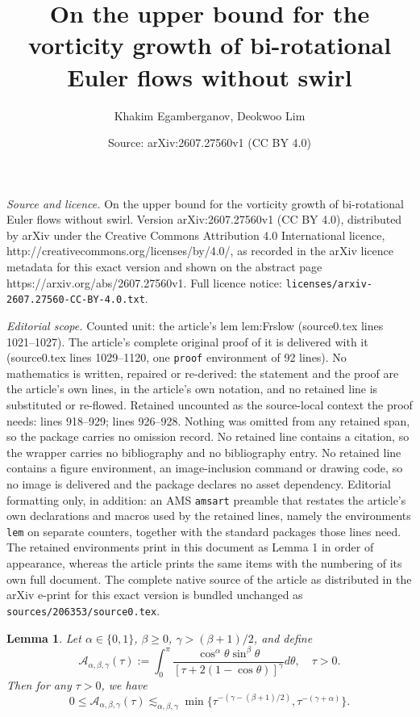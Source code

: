 \documentclass[10pt,a4paper]{amsart}
\title{On the upper bound for the vorticity growth of bi-rotational Euler flows without swirl}
\author{Khakim Egamberganov, Deokwoo Lim}
\date{Source: arXiv:2607.27560v1 (CC BY 4.0)}
\newtheorem{lem}{Lemma}
\newcommand{\alp}{\alpha}
\newcommand{\bt}{\beta}
\newcommand{\calA}{\mathcal A}
\newcommand{\calF}{\mathcal F}
\newcommand{\gmm}{\gamma}
\newcommand{\tht}{\theta}
\begin{document}
\maketitle

\noindent\emph{Source and licence.} On the upper bound for the vorticity growth of bi-rotational Euler flows without swirl. Version arXiv:2607.27560v1 (CC BY 4.0), distributed by arXiv under the Creative Commons Attribution 4.0 International licence, http://creativecommons.org/licenses/by/4.0/, as recorded in the arXiv licence metadata for this exact version and shown on the abstract page https://arxiv.org/abs/2607.27560v1. Full licence notice: \texttt{licenses/arxiv-2607.27560-CC-BY-4.0.txt}.\par\smallskip

\noindent\textit{Editorial scope.} Counted unit: the article's lem lem:Frslow (source0.tex lines 1021--1027). The article's complete original proof of it is delivered with it (source0.tex lines 1029--1120, one \texttt{proof} environment of 92 lines). No mathematics is written, repaired or re-derived: the statement and the proof are the article's own lines, in the article's own notation, and no retained line is substituted or re-flowed.  Retained uncounted as the source-local context the proof needs: lines 918--929; lines 926--928.  Nothing was omitted from any retained span, so the package carries no omission record.  No retained line contains a citation, so the wrapper carries no bibliography and no bibliography entry.  No retained line contains a figure environment, an image-inclusion command or drawing code, so no image is delivered and the package declares no asset dependency.  Editorial formatting only, in addition: an AMS \texttt{amsart} preamble that restates the article's own declarations and macros used by the retained lines, namely the environments \texttt{lem} on separate counters, together with the standard packages those lines need.  The retained environments print in this document as Lemma 1 in order of appearance, whereas the article prints the same items with the numbering of its own full document.  The complete native source of the article as distributed in the arXiv e-print for this exact version is bundled unchanged as \texttt{sources/206353/source0.tex}.
	\begin{lem}\label{lem:calAdecay}
		Let $\alp\in \{
		0,1\}$, $\bt\geq0$, $\gmm>(\bt+1)/2$, and define
		\begin{equation}
			\calA_{\alp,\bt,\gmm}(\tau):=\int_{0}^{\pi}\frac{\cos^{\alp}\tht\sin^{\bt}\tht}{[\tau+2(1-\cos\tht)]^{\gmm}}d\tht,\quad %
			\tau>0.
		\end{equation}
		Then for any $\tau>0$, we have
		\begin{equation}\label{eq:calAdecay}
			0\leq\calA_{\alp,\bt,\gmm}(\tau)\lesssim_{\alp,\bt,\gmm} \min\lbrace \tau^{-(\gmm-(\bt+1)/2)}, \tau^{-(\gmm+\alp)}\rbrace.
		\end{equation}
	\end{lem}
\end{document}
